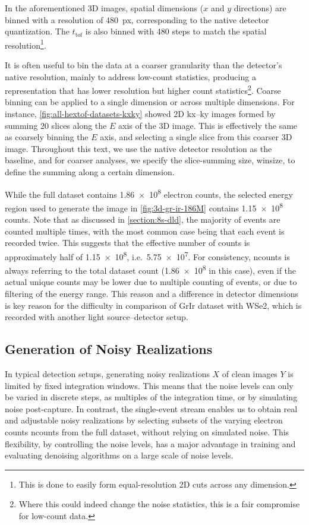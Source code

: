 In the aforementioned 3D images, spatial dimensions ($x$ and $y$ directions) are binned with a resolution of \qty{480}{px}, corresponding to the native detector quantization. The $t_{\text{tof}}$ is also binned with \num{480} steps to match the spatial resolution\footnote{This is done to easily form equal-resolution 2D cuts across any dimension.}. 

It is often useful to bin the data at a coarser granularity than the detector's native resolution, mainly to address low-count statistics, producing a representation that has lower resolution but higher count statistics\footnote{Where this could indeed change the noise statistics, this is a fair compromise for low-count data.}. Coarse binning can be applied to a single dimension or across multiple dimensions. For instance, \cref{fig:all-hextof-datasets-kxky} showed 2D \gls{kx}--\gls{ky} images formed by summing \num{20} slices along the $E$ axis of the 3D image. This is effectively the same as coarsely binning the $E$ axis, and selecting a single slice from this coarser 3D image. Throughout this text, we use the native detector resolution as the baseline, and for coarser analyses, we specify the slice-summing size, \gls{winsize}, to define the summing along a certain dimension. 

While the full dataset contains \num{1.86e8} electron counts, the selected energy region used to generate the image in \cref{fig:3d-gr-ir-186M} contains \num{1.15e8} counts. Note that as discussed in \cref{section:8s-dld}, the majority of events are counted multiple times, with the most common case being that each event is recorded twice. This suggests that the effective number of counts is approximately half of \num{1.15e8}, i.e.\ \num{5.75e7}. For consistency, \gls{ncounts} is always referring to the total dataset count (\num{1.86e8} in this case), even if the actual unique counts may be lower due to multiple counting of events, or due to filtering of the energy range. This reason and a difference in detector dimensions is key reason for the difficulty in comparison of \gls{GrIr} dataset with \gls{WSe2}, which is recorded with another light source--detector setup.

\subsection{Generation of Noisy Realizations}\label{section:noisy-realizations}
In typical detection setups, generating noisy realizations $X$ of clean images $Y$ is limited by fixed integration windows. This means that the noise levels can only be varied in discrete steps, as multiples of the integration time, or by simulating noise post-capture. In contrast, the single-event stream enables us to obtain real and adjustable noisy realizations by selecting subsets of the varying electron counts \gls{ncounts} from the full dataset, without relying on simulated noise. This flexibility, by controlling the noise levels, has a major advantage in training and evaluating denoising algorithms on a large scale of noise levels.

